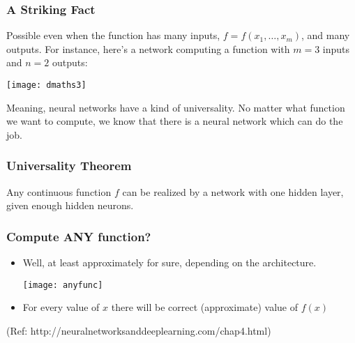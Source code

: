 \begin{frame}[fragile] \frametitle{A Striking Fact}
Possible even when the function has many inputs, $f=f(x_1,\ldots,x_m)$, and many outputs. For instance, here's a network computing a function with $m=3$ inputs and $n=2$ outputs:

\begin{center}
\texttt{[image: dmaths3]}
\end{center}

Meaning, neural networks have a kind of universality. No matter what function we want to compute, we know that there is a neural network which can do the job.
\end{frame}



\begin{frame}[fragile] \frametitle{Universality Theorem}
\begin{center}
{\Large Any continuous function $f$ can be realized by a network with one hidden layer, given enough hidden neurons.}
\end{center}

\end{frame}



\begin{frame}[fragile] \frametitle{Compute ANY function?}
\begin{itemize}
\item Well, at least approximately for sure, depending on the architecture.
\begin{center}
\texttt{[image: anyfunc]}
\end{center}
\item For every value of $x$ there will be correct (approximate) value of $f(x)$
\end{itemize}

{\tiny (Ref: http://neuralnetworksanddeeplearning.com/chap4.html)}

\end{frame}

